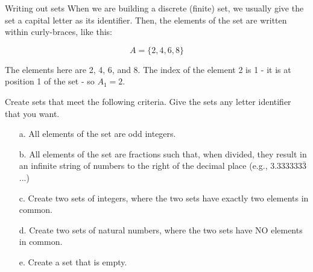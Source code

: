 \documentclass[a4paper,12pt]{book}
\newcounter{question}
\begin{document}
        \newpage

        \begin{intro}{Writing out sets}
            When we are building a discrete (finite) set,
            we usually give the set a capital letter as its
            identifier. Then, the elements of the set are written
            within curly-braces, like this:

            $$ A = \{ 2, 4, 6, 8 \} $$

            The elements here are 2, 4, 6, and 8.
            The index of the element 2 is 1 - it is
            at position 1 of the set - so $A_1 = 2$.
        \end{intro}


        \begin{questionNOGRADE}{\thequestion}

            Create sets that meet the following criteria.
            Give the sets any letter identifier that you want.

            \begin{enumerate}
                \item[a.]   All elements of the set are odd integers.
                    \solution{}{ ~\\~\\ }

                \item[b.]   All elements of the set are fractions
                    such that, when divided, they result in
                    an infinite string of numbers to the right
                    of the decimal place (e.g., $3.333333\bar{3}$...)
                    \solution{}{ ~\\~\\ }

                \item[c.]   Create two sets of integers, where
                    the two sets have exactly two elements in common.
                    \solution{}{ ~\\~\\ }

                \item[d.]   Create two sets of natural numbers,
                    where the two sets have NO elements in common.
                    \solution{}{ ~\\~\\ }

                \item[e.]   Create a set that is empty.
                    \solution{}{ ~\\~\\ }
            \end{enumerate}

        \end{questionNOGRADE}
\end{document}
